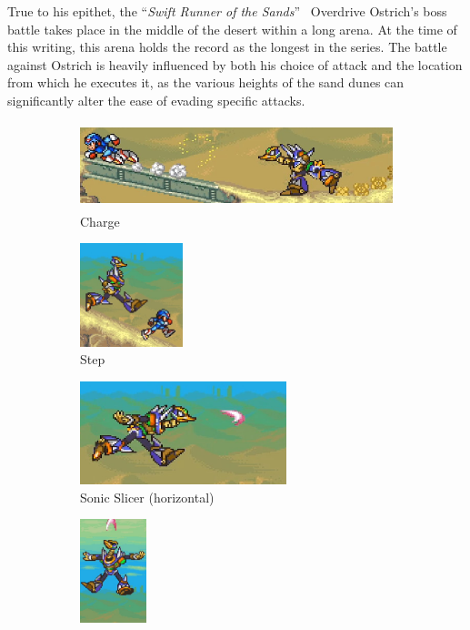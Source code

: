 True to his epithet, the ``\textit{Swift Runner of the Sands}''~\cite{book:MMX_Complete_art} Overdrive Ostrich's boss battle takes place in the middle of the desert within a long arena. At the time of this writing, this arena holds the record as the longest in the series. The battle against Ostrich is heavily influenced by both his choice of attack and the location from which he executes it, as the various heights of the sand dunes can significantly alter the ease of evading specific attacks.
\begin{figure}[htp]
	\centering
	\begin{subfigure}{\linewidth}
		\centering
		\includegraphics[height=2.5cm]{figures/X2/Overdrive_ostrich/Ostrich_running.png}
		\caption{Charge}
	\end{subfigure}
	\begin{subfigure}{0.3\linewidth}
		\centering
		\includegraphics[height=3cm]{figures/X2/Overdrive_ostrich/Ostrich_run&jump.png}
		\caption{Step}
	\end{subfigure}
	\begin{subfigure}{0.5\linewidth}
		\centering
		\includegraphics[height=3cm]{figures/X2/Overdrive_ostrich/Ostrich_sonic_slicer.png}
		\caption{Sonic Slicer (horizontal)}
	\end{subfigure}
	\begin{subfigure}{\linewidth}
		\centering
		\includegraphics[height=3cm]{figures/X2/Overdrive_ostrich/Ostrich_charged_SS.png}

\end{subfigure}
\end{figure}
